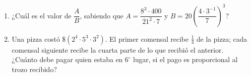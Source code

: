 \documentclass[11pt, letterpaper]{article}
\begin{document}
\begin{enumerate}[label=\textbf{\arabic*.}, leftmargin=*]
\item
\begin{minipage}[t]{\linewidth}
¿Cuál es el valor de $\dfrac{A}{B}$, sabiendo que $A=\dfrac{8^{3}\cdot 400}{21^{2}\cdot 7}$ y $B=20\left(\dfrac{4\cdot 3^{-1}}{7}\right)^{3}$?
\\%
\begin{minipage}{\linewidth}
\vspace{7mm}
\end{minipage}
\vspace{7mm}
\end{minipage}

\item
\begin{minipage}[t]{\linewidth}
Una pizza costó $\$\left(2^{4}\cdot 5^{3}\cdot 3^{2}\right)$. El primer comensal recibe $\tfrac{1}{4}$ de la pizza; cada comensal siguiente recibe la cuarta parte de lo que recibió el anterior. ¿Cuánto debe pagar quien estaba en $6^{\circ}$ lugar, si el pago es proporcional al trozo recibido?
\\%
\begin{minipage}{\linewidth}
\vspace{7mm}
\end{minipage}
\vspace{7mm}
\end{minipage}


\end{enumerate}
\end{document}

